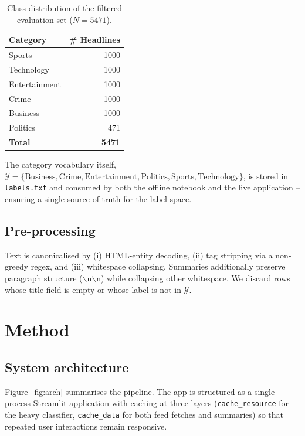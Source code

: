 \documentclass[10pt,twocolumn,letterpaper]{article}
\begin{document}
\begin{table}[t]
\centering
\caption{Class distribution of the filtered evaluation set ($N{=}5471$).}
\label{tab:dist}
\small
\begin{tabular}{lr}
\toprule
\textbf{Category} & \textbf{\# Headlines} \\
\midrule
Sports         & 1000 \\
Technology     & 1000 \\
Entertainment  & 1000 \\
Crime          & 1000 \\
Business       & 1000 \\
Politics       & \phantom{0}471 \\
\midrule
\textbf{Total} & \textbf{5471} \\
\bottomrule
\end{tabular}
\end{table}

The category vocabulary itself, $\mathcal{Y} = \{\text{Business}, \text{Crime}, \text{Entertainment}, \text{Politics}, \text{Sports}, \text{Technology}\}$, is stored in \texttt{labels.txt} and consumed by both the offline notebook and the live application -- ensuring a single source of truth for the label space.

\subsection{Pre-processing}
Text is canonicalised by (i) HTML-entity decoding, (ii) tag stripping via a non-greedy regex, and (iii) whitespace collapsing. Summaries additionally preserve paragraph structure ($\backslash$n$\backslash$n) while collapsing other whitespace. We discard rows whose title field is empty or whose label is not in $\mathcal{Y}$.

\section{Method}
\label{sec:method}

\subsection{System architecture}
Figure~\ref{fig:arch} summarises the pipeline. The app is structured as a single-process Streamlit application with caching at three layers (\texttt{cache\_resource} for the heavy classifier, \texttt{cache\_data} for both feed fetches and summaries) so that repeated user interactions remain responsive.
\end{document}

